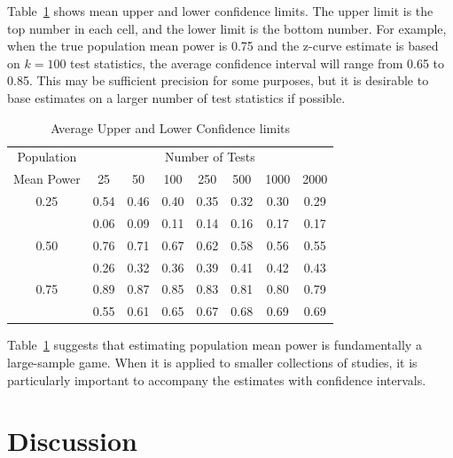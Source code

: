 \documentclass[jou]{apa6} %
\begin{document}
Table~\ref{meanlimits} shows mean upper and lower confidence limits. The upper limit is the top number in each cell, and the lower limit is the bottom number. For example, when the true population mean power is 0.75 and the z-curve estimate is based on $k=100$ test statistics, the average confidence interval will range from 0.65 to 0.85. This may be sufficient precision for some purposes, but it is desirable to base estimates on a larger number of test statistics if possible.
\begin{table}[H]
\caption{Average Upper and Lower Confidence limits}
{\small
\begin{center}
\begin{tabular}{c ccccccc }  \hline
Population & \multicolumn{7}{c}{Number of Tests} \\
Mean Power  &  25   &  50   &  100  &  250  &  500  & 1000  & 2000 \\ \hline
    0.25    & 0.54  & 0.46  & 0.40  & 0.35  & 0.32  & 0.30  &  0.29 \\
            & 0.06  & 0.09  & 0.11  & 0.14  & 0.16  & 0.17  & 0.17 \\
    0.50    & 0.76  & 0.71  & 0.67  & 0.62  & 0.58  & 0.56  & 0.55 \\
            & 0.26  & 0.32  & 0.36  & 0.39  & 0.41  & 0.42  & 0.43 \\
    0.75    & 0.89  & 0.87  & 0.85  & 0.83  & 0.81  & 0.80  & 0.79 \\
            & 0.55  & 0.61  & 0.65  & 0.67  & 0.68  & 0.69  & 0.69 \\ \hline
\end{tabular}
\end{center}
} %
\label{meanlimits}  %
\end{table}
Table~\ref{meanlimits} suggests that estimating population mean power is fundamentally a large-sample game. When it is applied to smaller collections of studies, it is particularly important to accompany the estimates with confidence intervals. 

\section{Discussion}  %
\end{document}
